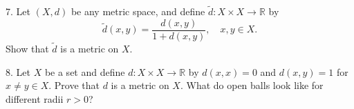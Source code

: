 \documentclass{article}
\theoremstyle{remark} %
\newcommand{\R}{{\mathbb{R}}}
\begin{document}



7. Let $(X,d)$ be any metric space, and define $\tilde d: X \times X \to \R$ by 
    \begin{equation*}
        \tilde d(x,y) = \frac{d(x,y)}{1+d(x,y)}, \quad x,y \in X .
    \end{equation*}
    Show that $\tilde d$ is a metric on $X$.

\vspace{11cm} %



8. Let $X$ be a set and define $d\colon X \times X \to \R$ by $d(x,x) = 0$ and $d(x,y)=1$ for $x\neq y \in X$. Prove that $d$ is a metric on $X$. What do open balls look like for different radii $r>0$? %

\vspace{13cm} %

\end{document}
